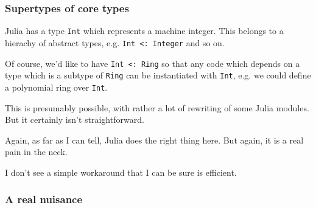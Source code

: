 \documentclass[a4paper,10pt]{article}
\newcommand{\code}{\lstinline}
\begin{document}
\subsubsection{Supertypes of core types}

Julia has a type \code{Int} which represents a machine integer. This belongs to a hierachy of abstract
types, e.g. \code{Int <: Integer} and so on. 

Of course, we'd like to have \code{Int <: Ring} so that any code which depends on a type which is a subtype
of \code{Ring} can be instantiated with \code{Int}, e.g. we could define a polynomial ring over \code{Int}.

This is presumably possible, with rather a lot of rewriting of some Julia modules. But it certainly isn't
straightforward.

Again, as far as I can tell, Julia does the right thing here. But again, it is a real pain in the neck.

I don't see a simple workaround that I can be sure is efficient.

\subsubsection{A real nuisance}
\end{document}
